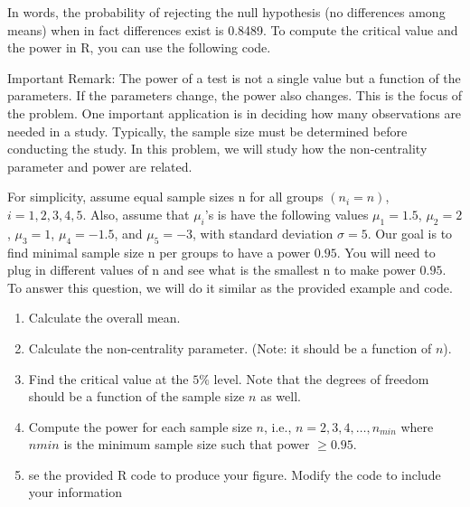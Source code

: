 \documentclass{article}
\begin{document}
In words, the probability of rejecting the null hypothesis (no differences among means) when in
fact differences exist is 0.8489. To compute the critical value and the power in R, you can use the
following code.

Important Remark: The power of a test is not a single value but a function of the parameters. If
the parameters change, the power also changes. This is the focus of the problem. One important
application is in deciding how many observations are needed in a study. Typically, the sample
size must be determined before conducting the study. In this problem, we will study how the
non-centrality parameter and power are related.

For simplicity, assume equal sample sizes n for all groups $(n_i = n)$, $i = 1, 2, 3, 4, 5$. Also, assume
that $\mu_i$'s is have the following values $\mu_1 = 1.5$, $\mu_2 = 2$, $\mu_3 = 1$, $\mu_4 = -1.5$, and $\mu_5 = -3$, with standard
deviation $\sigma = 5$. Our goal is to find minimal sample size n per groups to have a power $0.95$. You
will need to plug in different values of n and see what is the smallest n to make power $0.95$. To
answer this question, we will do it similar as the provided example and code.

\begin{enumerate}
	\item Calculate the overall mean.
	\item Calculate the non-centrality parameter. (Note: it should be a function of $n$).
	\item Find the critical value at the $5\%$ level. Note that the degrees of freedom should be a function of the
	      sample size $n$ as well.
	\item Compute the power for each sample size $n$, i.e., $n=2,3,4,\ldots,n_{min}$
	      where $n{min}$ is the minimum sample size such that power $\ge 0.95$.
	\item se the provided R code to produce your figure. Modify the code to include your information
\end{enumerate}
\end{document}
